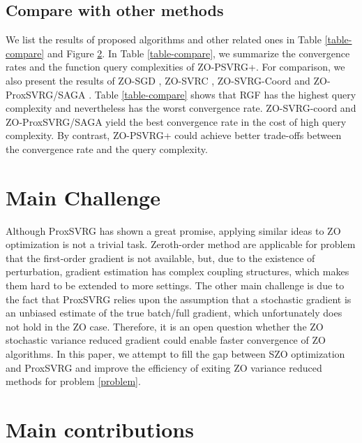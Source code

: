 \documentclass{article}
\theoremstyle{definition}
\theoremstyle{remark}
\begin{document}
\subsection{Compare with other methods}
{\color{Violet}
We list the results of proposed algorithms and other related ones in Table \ref{table-compare} and Figure \ref{}.
}
{\color{Brown}
In Table \ref{table-compare}, we summarize the convergence rates
and the function query complexities of ZO-PSVRG+. 
For comparison, we also present the results of ZO-SGD \cite{ghadimi2013stochastic}, ZO-SVRC \cite{gu2016zeroth}, ZO-SVRG-Coord \cite{liu2018zeroth} and ZO-ProxSVRG/SAGA \cite{huang2019faster}. Table \ref{table-compare} shows
that RGF has the highest query complexity and nevertheless has the worst convergence rate. ZO-SVRG-coord
and ZO-ProxSVRG/SAGA yield the best convergence rate in the cost of high query complexity. By contrast, ZO-PSVRG+ could achieve better trade-offs between the
convergence rate and the query complexity.
}



\section{Main Challenge}
{\color{Brown}
Although ProxSVRG has shown a great promise, applying similar ideas to ZO optimization is not a trivial
task. 
{\color{DarkOrchid}
Zeroth-order method are applicable for problem that the first-order gradient is not available, but, due to the existence of
perturbation, gradient estimation has complex coupling structures, which makes
them hard to be extended to more settings. 
}
The other main challenge is due to the fact that ProxSVRG relies upon the assumption that a stochastic gradient is an unbiased estimate of the true batch/full gradient, which unfortunately does not hold in the ZO case. Therefore, it is an open question whether the ZO stochastic variance reduced gradient could enable faster convergence of ZO algorithms. In this paper, we attempt to fill the gap between
SZO optimization and ProxSVRG and improve the efficiency of exiting ZO variance reduced methods for problem \eqref{problem}.
}


\section{Main contributions}
\end{document}
